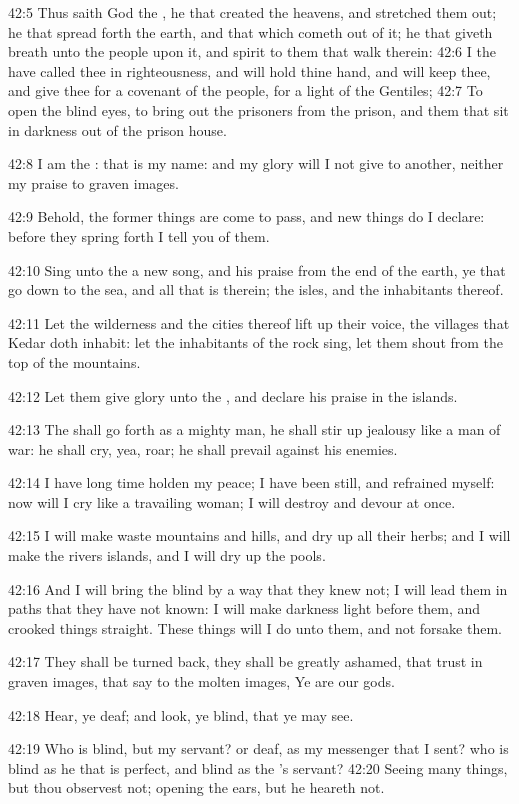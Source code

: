 42:5 Thus saith God the \LORD, he that created the heavens, and
stretched them out; he that spread forth the earth, and that which
cometh out of it; he that giveth breath unto the people upon it, and
spirit to them that walk therein: 42:6 I the \LORD have called thee in
righteousness, and will hold thine hand, and will keep thee, and give
thee for a covenant of the people, for a light of the Gentiles; 42:7
To open the blind eyes, to bring out the prisoners from the prison,
and them that sit in darkness out of the prison house.

42:8 I am the \LORD: that is my name: and my glory will I not give to
another, neither my praise to graven images.

42:9 Behold, the former things are come to pass, and new things do I
declare: before they spring forth I tell you of them.

42:10 Sing unto the \LORD a new song, and his praise from the end of
the earth, ye that go down to the sea, and all that is therein; the
isles, and the inhabitants thereof.

42:11 Let the wilderness and the cities thereof lift up their voice,
the villages that Kedar doth inhabit: let the inhabitants of the rock
sing, let them shout from the top of the mountains.

42:12 Let them give glory unto the \LORD, and declare his praise in the
islands.

42:13 The \LORD shall go forth as a mighty man, he shall stir up
jealousy like a man of war: he shall cry, yea, roar; he shall prevail
against his enemies.

42:14 I have long time holden my peace; I have been still, and
refrained myself: now will I cry like a travailing woman; I will
destroy and devour at once.

42:15 I will make waste mountains and hills, and dry up all their
herbs; and I will make the rivers islands, and I will dry up the
pools.

42:16 And I will bring the blind by a way that they knew not; I will
lead them in paths that they have not known: I will make darkness
light before them, and crooked things straight. These things will I do
unto them, and not forsake them.

42:17 They shall be turned back, they shall be greatly ashamed, that
trust in graven images, that say to the molten images, Ye are our
gods.

42:18 Hear, ye deaf; and look, ye blind, that ye may see.

42:19 Who is blind, but my servant? or deaf, as my messenger that I
sent?  who is blind as he that is perfect, and blind as the \LORD's
servant?  42:20 Seeing many things, but thou observest not; opening
the ears, but he heareth not.

